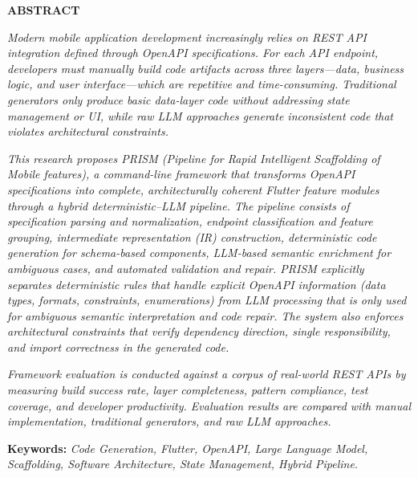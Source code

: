 \newpage

\begin{center}
    {\fontsize{12pt}{14pt}\selectfont\textbf{ABSTRACT}\par}
    \vspace{0.8cm}
\end{center}

\textit{Modern mobile application development increasingly relies on REST API integration defined through OpenAPI specifications. For each API endpoint, developers must manually build code artifacts across three layers---data, business logic, and user interface---which are repetitive and time-consuming. Traditional generators only produce basic data-layer code without addressing state management or UI, while raw LLM approaches generate inconsistent code that violates architectural constraints.}

\textit{This research proposes PRISM (Pipeline for Rapid Intelligent Scaffolding of Mobile features), a command-line framework that transforms OpenAPI specifications into complete, architecturally coherent Flutter feature modules through a hybrid deterministic--LLM pipeline. The pipeline consists of specification parsing and normalization, endpoint classification and feature grouping, intermediate representation (IR) construction, deterministic code generation for schema-based components, LLM-based semantic enrichment for ambiguous cases, and automated validation and repair. PRISM explicitly separates deterministic rules that handle explicit OpenAPI information (data types, formats, constraints, enumerations) from LLM processing that is only used for ambiguous semantic interpretation and code repair. The system also enforces architectural constraints that verify dependency direction, single responsibility, and import correctness in the generated code.}

\textit{Framework evaluation is conducted against a corpus of real-world REST APIs by measuring build success rate, layer completeness, pattern compliance, test coverage, and developer productivity. Evaluation results are compared with manual implementation, traditional generators, and raw LLM approaches.}

\vspace{0.5cm}
\noindent \textbf{Keywords:} \textit{Code Generation, Flutter, OpenAPI, Large Language Model, Scaffolding, Software Architecture, State Management, Hybrid Pipeline}.

\newpage
